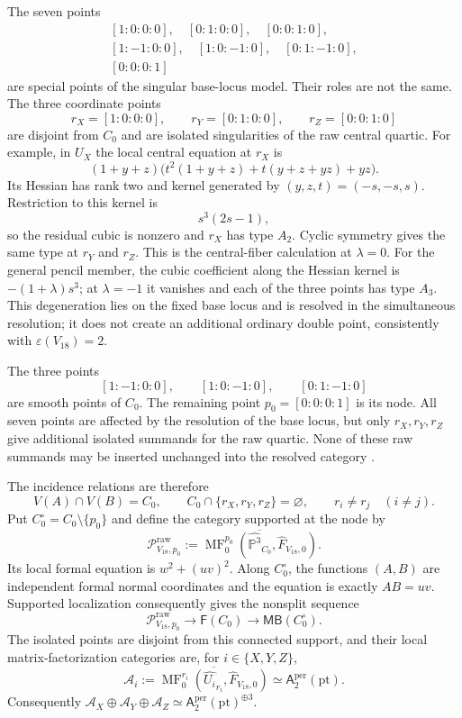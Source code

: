 \documentclass[11pt]{amsart}
\theoremstyle{definition}
\theoremstyle{remark}
\DeclareMathOperator{\MF}{MF}
\newcommand{\MBcat}[1]{\mathsf{MB}(#1)}
\newcommand{\Aper}[2]{\mathsf{A}^{\mathrm{per}}_{#2}(#1)}
\newcommand{\FormalCat}[1]{\mathsf{F}(#1)}
\begin{document}
The seven points
\[
\begin{gathered}
[1:0:0:0],\quad[0:1:0:0],\quad[0:0:1:0],\\
[1:-1:0:0],\quad[1:0:-1:0],\quad[0:1:-1:0],\\
[0:0:0:1]
\end{gathered}
\]
are special points of the singular base-locus model.  Their roles are not the
same.  The three coordinate points
\[
r_X=[1:0:0:0],\qquad
r_Y=[0:1:0:0],\qquad
r_Z=[0:0:1:0]
\]
are disjoint from $C_0$ and are isolated singularities of the raw central
quartic.  For example, in $U_X$ the local central equation at $r_X$ is
\[
(1+y+z)
\bigl(t^2(1+y+z)+t(y+z+yz)+yz\bigr).
\]
Its Hessian has rank two and kernel generated by
$(y,z,t)=(-s,-s,s)$.  Restriction to this kernel is
\[
s^3(2s-1),
\]
so the residual cubic is nonzero and $r_X$ has type $A_2$.  Cyclic symmetry
gives the same type at $r_Y$ and $r_Z$.  This is the central-fiber
calculation at $\lambda=0$.  For the general pencil member, the cubic
coefficient along the Hessian kernel is $-(1+\lambda)s^3$; at $\lambda=-1$
it vanishes and each of the three points has type $A_3$.  This degeneration
lies on the fixed base locus and is resolved in the simultaneous resolution;
it does not create an additional ordinary double point, consistently with
$\varepsilon(V_{18})=2$.

The three points
\[
[1:-1:0:0],\qquad[1:0:-1:0],\qquad[0:1:-1:0]
\]
are smooth points of $C_0$.  The remaining point $p_0=[0:0:0:1]$ is its node.
All seven points are affected by the resolution of the base locus, but only
$r_X,r_Y,r_Z$ give additional isolated summands for the raw quartic.  None of
these raw summands may be inserted unchanged into the resolved category
\cite{PrzyjalkowskiCY,PrzyjalkowskiToric}.

The incidence relations are therefore
\[
V(A)\cap V(B)=C_0,
\qquad
C_0\cap\{r_X,r_Y,r_Z\}=\varnothing,
\qquad
r_i\neq r_j\quad(i\neq j).
\]
Put $C_0^\circ=C_0\setminus\{p_0\}$ and define the category supported at the
node by
\[
\mathcal P^{\mathrm{raw}}_{V_{18},p_0}
:=
\overline{\MF^{p_0}_0\!\left(
\widehat{\mathbb P^3}_{C_0},\widehat F_{V_{18},0}
\right)}.
\]
Its local formal equation is $w^2+(uv)^2$.  Along $C_0^\circ$, the functions
$(A,B)$ are independent formal normal coordinates and the equation is exactly
$AB=uv$.  Supported localization consequently gives the nonsplit sequence
\begin{equation}
\label{eq:V18_raw_localization}
\mathcal P^{\mathrm{raw}}_{V_{18},p_0}
\longrightarrow
\FormalCat{C_0}
\longrightarrow
\MBcat{C_0^\circ}.
\end{equation}
The isolated points are disjoint from this connected support, and their local
matrix-factorization categories are, for $i\in\{X,Y,Z\}$,
\[
\mathcal A_i
:=
\overline{\MF^{r_i}_0(\widehat{U_i}_{r_i},\widehat F_{V_{18},0})}
\simeq\Aper{\mathrm{pt}}{2}.
\]
Consequently
$\mathcal A_X\oplus\mathcal A_Y\oplus\mathcal A_Z
\simeq\Aper{\mathrm{pt}}{2}^{\oplus3}$.
\end{document}
